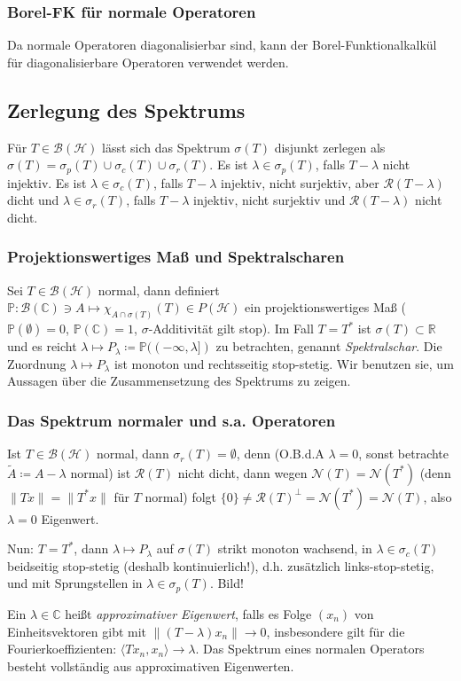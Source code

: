 \documentclass[11pt,a4paper]{scrartcl}
\newcommand{\R}{\mathbb{R}} %
\newcommand{\C}{\mathbb{C}} %
\newcommand{\Hc}{\mathcal{H}}
\newcommand{\B}{\mathcal{B}}
\newcommand{\Nc}{\mathcal{N}}
\newcommand{\Rc}{\mathcal{R}}
\theoremstyle{plain}
\theoremstyle{definition}
\theoremstyle{remark}
\begin{document}
\subsubsection{Borel-FK für normale Operatoren}

Da normale Operatoren diagonalisierbar sind, kann der Borel-Funktionalkalkül für diagonalisierbare Operatoren verwendet werden.

\subsection{Zerlegung des Spektrums}

Für $T\in \B(\Hc)$ lässt sich das Spektrum $\sigma(T)$ disjunkt zerlegen als $\sigma(T)=\sigma_p(T) \cup \sigma_c(T) \cup \sigma_r(T)$. Es ist $\lambda \in \sigma_p(T)$, falls $T-\lambda$ nicht injektiv. Es ist $\lambda \in \sigma_c(T)$, falls $T-\lambda$ injektiv, nicht surjektiv, aber $\Rc(T-\lambda)$ dicht und $\lambda \in \sigma_r(T)$, falls $T-\lambda$ injektiv, nicht surjektiv und $\Rc(T-\lambda)$ nicht dicht.

\subsubsection{Projektionswertiges Maß und Spektralscharen}

Sei $T\in \B(\Hc)$ normal, dann definiert $\mathbb{P}: \B(\C) \ni A \mapsto \chi_{A\cap \sigma(T)}(T) \in P(\Hc)$ ein projektionswertiges Maß ($\mathbb{P}(\emptyset) = 0$, $\mathbb{P}(\C) = 1$, $\sigma$-Additivität gilt stop). Im Fall $T=T^*$ ist $\sigma(T)\subset \R$ und es reicht $\lambda \mapsto P_\lambda \coloneqq \mathbb{P}((-\infty, \lambda])$ zu betrachten, genannt \emph{Spektralschar}. Die Zuordnung $\lambda \mapsto P_\lambda$ ist monoton und rechtsseitig stop-stetig. Wir benutzen sie, um Aussagen über die Zusammensetzung des Spektrums zu zeigen.

\subsubsection{Das Spektrum normaler und s.a. Operatoren}

Ist $T\in \B(\Hc)$ normal, dann $\sigma_r(T)=\emptyset$, denn (O.B.d.A $\lambda=0$, sonst betrachte $\tilde A \coloneqq A-\lambda$ normal) ist $\Rc(T)$ nicht dicht, dann wegen $\Nc(T)=\Nc(T^*)$ (denn $\|Tx\|=\|T^*x\|$ für $T$ normal) folgt $\{0\} \neq \Rc(T)^\bot = \Nc(T^*) = \Nc(T)$, also $\lambda=0$ Eigenwert.

Nun: $T=T^*$, dann $\lambda \mapsto P_\lambda$ auf $\sigma(T)$ strikt monoton wachsend, in $\lambda \in \sigma_c(T)$ beidseitig stop-stetig (deshalb kontinuierlich!), d.h. zusätzlich links-stop-stetig,  und mit Sprungstellen in $\lambda \in \sigma_p(T)$. Bild!

Ein $\lambda\in \C$ heißt \emph{approximativer Eigenwert}, falls es Folge $(x_n)$ von Einheitsvektoren gibt mit $\|(T-\lambda)x_n\| \to 0$, insbesondere gilt für die Fourierkoeffizienten: $\langle Tx_n, x_n \rangle \to \lambda$. Das Spektrum eines normalen Operators besteht vollständig aus approximativen Eigenwerten.
\end{document}
